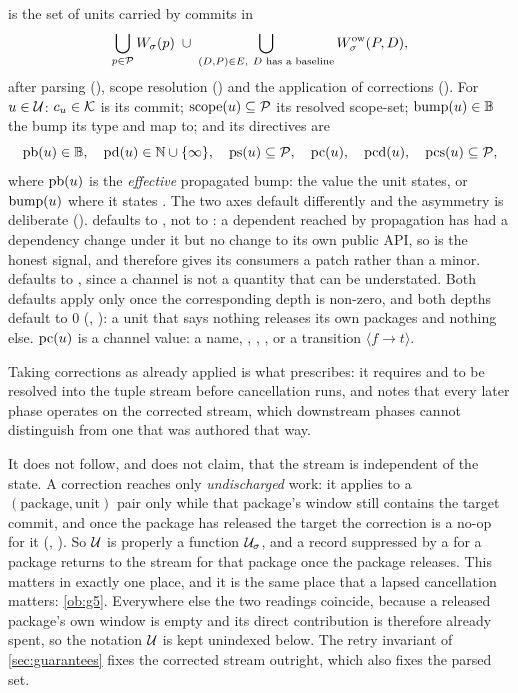 \begin{definition}
\label{def:unit}
\Units{} is the set of units carried by commits in
\[
  \bigcup_{p \in \mathcal{P}}W_{\sigma}(p)
  \;\cup\;
  \bigcup_{(D,P) \in E,\ D \text{ has a baseline}} W^{\mathrm{ow}}_{\sigma}(P,D),
\]
after parsing (), scope resolution () and the application of
corrections (). For $u \in \mathcal{U}$:
$c_{u} \in \mathcal{K}$ is its commit; $\mathrm{scope}(u) \subseteq \mathcal{P}$ its resolved
scope-set; $\mathrm{bump}(u) \in \mathbb{B}$ the bump its type and \code{!} map to; and
its directives are
\[
  \mathrm{pb}(u) \in \mathbb{B},\quad
  \mathrm{pd}(u) \in \mathbb{N} \cup \{\infty\},\quad
  \mathrm{ps}(u) \subseteq \mathcal{P},\quad
  \mathrm{pc}(u),\quad
  \mathrm{pcd}(u),\quad
  \mathrm{pcs}(u) \subseteq \mathcal{P},
\]
where $\mathrm{pb}(u)$ is the \emph{effective} propagated bump: the value the unit
states, or $\mathrm{bump}(u)$ where it states . The two axes default
differently and the asymmetry is deliberate (). 
defaults to \bpatch, not to : a dependent reached by propagation
has had a dependency change under it but no change to its own public API, so
\bpatch{} is the honest signal, and  therefore gives its
consumers a patch rather than a minor.  defaults to
, since a channel is not a quantity that can be understated.
Both defaults apply only once the corresponding depth is non-zero, and both
depths default to $0$ (, ): a unit that says nothing
releases its own packages and nothing else. $\mathrm{pc}(u)$ is a channel value: a
name, \stable, , , or a transition
$\langle f \to t\rangle$.
\end{definition}

Taking corrections as already applied is what  prescribes: it
requires  and  to be resolved into the tuple stream
before cancellation runs, and notes that every later phase operates on the
corrected stream, which downstream phases cannot distinguish from one that was
authored that way.

\begin{remark}
\label{rem:corrections}
It does not follow, and  does not claim, that the stream is
independent of the state. A correction reaches only \emph{undischarged} work:
it applies to a $(\text{package}, \text{unit})$ pair only while that package's
window still contains the target commit, and once the package has released the
target the correction is a no-op for it (, ). So
$\mathcal{U}{}$ is properly a function $\mathcal{U}_{\sigma}$, and a record suppressed by a
 for a package returns to the stream for that package once the
package releases. This matters in exactly one place, and it is the same place
that a lapsed cancellation matters: \cref{ob:g5}. Everywhere else the two
readings coincide, because a released package's own window is empty and its
direct contribution is therefore already spent, so the notation
$\mathcal{U}{}$ is kept unindexed below. The retry invariant of
\cref{sec:guarantees} fixes the corrected stream outright, which also fixes
the parsed set.
\end{remark}

